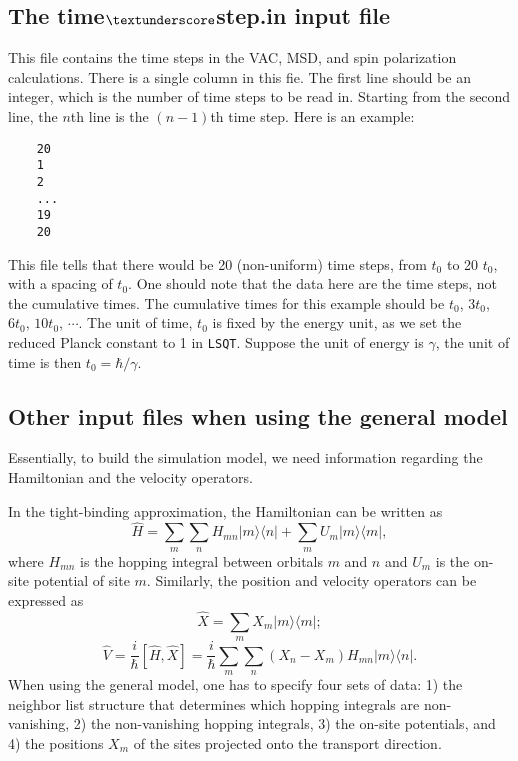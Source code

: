 \documentclass[12pt,a4paper]{report}
\begin{document}
\subsection{The time$\textunderscore$step.in input file}


This file contains the time steps in the VAC, MSD, and spin polarization calculations. There is a single column in this fie. The first line should be an integer, which is the number of time steps to be read in. Starting from the second line, the $n$th line is the $(n-1)$th time step. Here is an example:
\begin{verbatim}
    20
    1
    2
    ...
    19
    20
\end{verbatim}
This file tells that there would be 20 (non-uniform) time steps, from $t_0$ to 20 $t_0$, with a spacing of $t_0$. One should note that the data here are the time steps, not the cumulative times. The cumulative times for this example should be $t_0$, $3t_0$, $6t_0$, $10t_0$, $\cdots$. The unit of time, $t_0$ is fixed by the energy unit, as we set the reduced Planck constant to 1 in \verb"LSQT". Suppose the unit of energy is $\gamma$, the unit of time is then $t_0=\hbar/\gamma$.

\subsection{Other input files when using the general model}

Essentially, to build the simulation model, we need information regarding the Hamiltonian and the velocity operators.

In the tight-binding approximation, the Hamiltonian can be written as
\begin{equation}
 \hat{H} = \sum_m\sum_n H_{mn} |m\rangle \langle n| 
 + \sum_m U_m |m\rangle \langle m|,
\end{equation}
where $H_{mn}$ is the hopping integral between orbitals $m$ and $n$ and $U_m$ is the on-site potential of site $m$. Similarly, the position and velocity operators can be expressed as
\begin{equation}
 \hat{X} = \sum_{m} X_m |m\rangle \langle m|;
\end{equation}
\begin{equation}
 \hat{V} = \frac{i}{\hbar} [\hat{H},\hat{X}]
= \frac{i}{\hbar} \sum_m\sum_n
 (X_n-X_m) H_{mn} |m\rangle \langle n|.
\end{equation}
When using the general model, one has to specify four sets of data: 1) the neighbor list structure that determines which hopping integrals are non-vanishing, 2) the non-vanishing hopping integrals, 3) the on-site potentials, and 4) the positions $X_m$ of the sites projected onto the transport direction.
\end{document}
